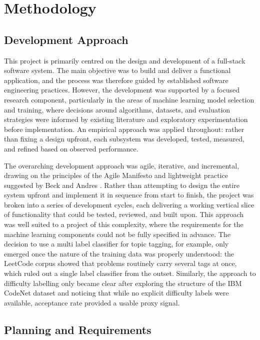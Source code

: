 \chapter{Methodology}

\section{Development Approach}

This project is primarily centred on the design and development of a full-stack software system. The main objective was to build and deliver a functional application, and the process was therefore guided by established software engineering practices. However, the development was supported by a focused research component, particularly in the areas of machine learning model selection and training, where decisions around algorithms, datasets, and evaluation strategies were informed by existing literature and exploratory experimentation before implementation. An empirical approach was applied throughout: rather than fixing a design upfront, each subsystem was developed, tested, measured, and refined based on observed performance.

The overarching development approach was agile, iterative, and incremental,
drawing on the principles of the Agile Manifesto \cite{agilemanifesto2001}
and lightweight practice suggested by Beck and Andres \cite{beck2004xp}.
Rather than attempting to design the entire system upfront and implement
it in sequence from start to finish, the project was broken into a series
of development cycles, each delivering a working vertical slice of
functionality that could be tested, reviewed, and built upon. This
approach was well suited to a project of this complexity, where the
requirements for the machine learning components could not be fully
specified in advance. The decision to use a multi label classifier for
topic tagging, for example, only emerged once the nature of the training
data was properly understood: the LeetCode corpus showed that problems
routinely carry several tags at once, which ruled out a single label
classifier from the outset. Similarly, the approach to difficulty labelling
only became clear after exploring the structure of the IBM CodeNet dataset
and noticing that while no explicit difficulty labels were available,
acceptance rate provided a usable proxy signal.

\section{Planning and Requirements}

